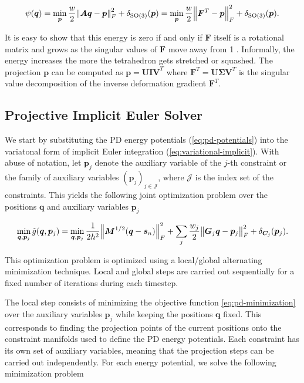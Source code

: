 \begin{equation}\label{eq:pd-strain}
    \psi({\bm{q}}) = \min_{\bm{p}} \frac{w}{2} \norm{\bm{Aq} - \bm{p}}^2_F + \delta_{\text{SO}(3)}(\bm{p})
    = \min_{\bm{p}} \frac{w}{2} \norm{\bm{F}^T - \bm{p}}^2_F + \delta_{\text{SO}(3)}(\bm{p}).
\end{equation}

\noindent It is easy to show that this energy is zero if and only if $\bm{F}$ itself is a rotational matrix and grows as the 
singular values of $\bm{F}$ move away from 1 \cite{bouaziz2014}. Informally, the energy increases the more the tetrahedron gets 
stretched or squashed. The projection $\bm{p}$ can be computed 
as $\bm{p} = \bm{UIV}^T$ where $\bm{F}^T = \bm{U \Sigma V}^T$ is the singular value decomposition of the inverse deformation 
gradient $\bm{F}^T$.

\subsection{Projective Implicit Euler Solver}\label{ss:pd-solver}
We start by substituting the PD energy potentials (\cref{eq:pd-potentials}) into the variatonal form of implicit Euler integration
(\cref{eq:variational-implicit}). With abuse of notation, let $\bm{p}_j$ denote the auxiliary variable of the $j$-th constraint or 
the family of auxiliary variables $(\bm{p}_j)_{j \in \mathcal{J}}$, where $\mathcal{J}$ is the index set of the 
constraints. This yields the following joint optimization problem over the positions $\bm{q}$ and auxiliary variables $\bm{p}_j$ 

\begin{equation}\label{eq:pd-minimization}
    \min_{\bm{q}, \bm{p}_j} \tilde{g}(\bm{q}, \bm{p}_j) = 
    \min_{\bm{q}, \bm{p}_j} \frac{1}{2h^2} \norm{\bm{M}^{1/2}(\bm{q} - \bm{s}_n)}^2_F + \sum_j \frac{w_j}{2} \norm{\bm{G}_j\bm{q}
    - \bm{p}_j}^2_F + \delta_{\bm{C}_j}(\bm{p}_j).
\end{equation}

\noindent This optimization problem is optimized using a local/global alternating minimization technique. Local and global steps 
are carried out sequentially for a fixed number of iterations during each timestep. 

The local step consists of minimizing the objective function \cref{eq:pd-minimization} over 
the auxiliary variables $\bm{p}_j$ while keeping the positions $\bm{q}$ fixed. This corresponds to finding the projection points of 
the current positions onto the constraint manifolds used to define the PD energy potentials. Each constraint has its own 
set of auxiliary variables, meaning that the projection steps can be carried out independently. For each energy potential, we solve the 
following minimization problem

